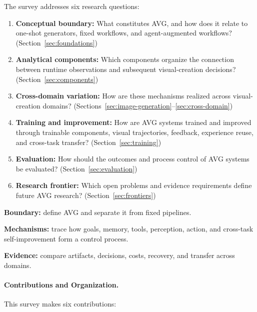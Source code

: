 The survey addresses six research questions:

\begin{enumerate}
  \item \textbf{Conceptual boundary:} What constitutes AVG, and how does it relate to one-shot generators, fixed workflows, and agent-augmented workflows? (Section~\ref{sec:foundations})
  \item \textbf{Analytical components:} Which components organize the connection between runtime observations and subsequent visual-creation decisions? (Section~\ref{sec:components})
  \item \textbf{Cross-domain variation:} How are these mechanisms realized across visual-creation domains? (Sections~\ref{sec:image-generation}--\ref{sec:cross-domain})
  \item \textbf{Training and improvement:} How are AVG systems trained and improved through trainable components, visual trajectories, feedback, experience reuse, and cross-task transfer? (Section~\ref{sec:training})
  \item \textbf{Evaluation:} How should the outcomes and process control of AVG systems be evaluated? (Section~\ref{sec:evaluation})
  \item \textbf{Research frontier:} Which open problems and evidence requirements define future AVG research? (Section~\ref{sec:frontiers})
\end{enumerate}

\begin{keytakeaway}
\begin{keypoints}
  \item \textbf{Boundary:} define AVG and separate it from fixed pipelines.
  \item \textbf{Mechanisms:} trace how goals, memory, tools, perception, action, and cross-task self-improvement form a control process.
  \item \textbf{Evidence:} compare artifacts, decisions, costs, recovery, and transfer across domains.
\end{keypoints}
\end{keytakeaway}

\paragraph{Contributions and Organization.}
This survey makes six contributions:

